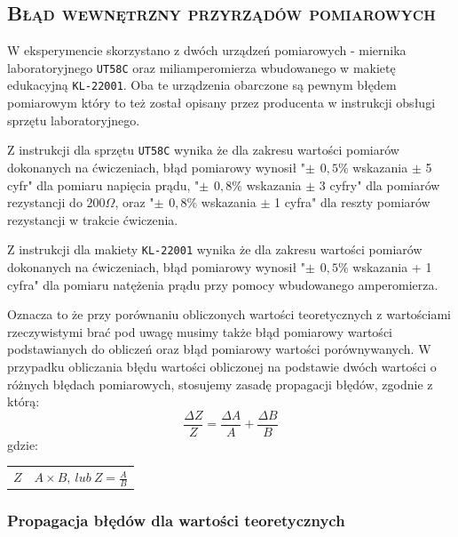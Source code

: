 \documentclass[,a4paper,12pt]{article}
\makeatletter
\newenvironment{conditions}
  {\par\vspace{\abovedisplayskip}\noindent\begin{tabular}{>{$}l<{$} @{${}={}$} l}}
  {\end{tabular}\par\vspace{\belowdisplayskip}}
\renewcommand{\cite}{\supercite}
\makeatother
\begin{document}
\subsection{\textsc{Błąd wewnętrzny przyrządów pomiarowych}}
W eksperymencie skorzystano z dwóch urządzeń pomiarowych - miernika laboratoryjnego \texttt{UT58C} oraz miliamperomierza wbudowanego w makietę edukacyjną \texttt{KL-22001}. Oba te urządzenia obarczone są pewnym błędem pomiarowym który to też został opisany przez producenta w instrukcji obsługi sprzętu laboratoryjnego.\\ \par Z instrukcji dla sprzętu \texttt{UT58C} wynika że dla zakresu wartości pomiarów dokonanych na ćwiczeniach, błąd pomiarowy wynosił "$\pm\hspace{5pt}0,5\%$ wskazania $\pm$ 5 cyfr" dla pomiaru napięcia prądu, "$\pm\hspace{5pt}0,8\%$ wskazania $\pm$ 3 cyfry" dla pomiarów rezystancji do $200\Omega$, oraz  "$\pm\hspace{5pt}0,8\%$ wskazania $\pm$ 1 cyfra"  dla reszty pomiarów rezystancji w trakcie ćwiczenia\cite{instrukcja_ut58}.\\ \par Z instrukcji dla makiety \texttt{KL-22001} wynika że dla zakresu wartości pomiarów dokonanych na ćwiczeniach, błąd pomiarowy wynosił "$\pm\hspace{5pt}0,5\%$ wskazania + 1 cyfra" dla pomiaru natężenia prądu przy pomocy wbudowanego amperomierza\cite{ndn_instrukcja_736}. \\ \par
Oznacza to że przy porównaniu obliczonych wartości teoretycznych z wartościami rzeczywistymi brać pod uwagę musimy także błąd pomiarowy wartości podstawianych do obliczeń oraz błąd pomiarowy wartości porównywanych. W przypadku obliczania błędu wartości obliczonej na podstawie dwóch wartości o różnych błędach pomiarowych, stosujemy zasadę propagacji błędów, zgodnie z którą:
\begin{equation}
    \frac{\Delta Z}{Z}=\frac{\Delta A}{A} + \frac{\Delta B}{B}
\end{equation}
gdzie:
\begin{conditions}
    Z&$A\times B,\ lub\ Z=\frac{A}{B}$
\end{conditions}
\subsubsection{Propagacja błędów dla wartości teoretycznych}
\end{document}
